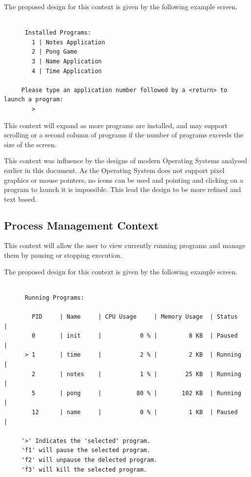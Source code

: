\documentclass[a4paper]{report}
\begin{document}
The proposed design for this context is given by the following example screen.
{\ttfamily \small
  \begin{framed}
    \begin{verbatim}

      Installed Programs:
        1 | Notes Application
        2 | Pong Game
        3 | Name Application
        4 | Time Application

     Please type an application number followed by a <return> to launch a program:
        >

    \end{verbatim}
  \end{framed}
}


This context will expand as more programs are installed, and may support scrolling or a second column of programs if the number of programs exceeds the size of the screen.

This context was influence by the designs of modern Operating Systems analysed earlier in this document. As the Operating System does not support pixel graphics or mouse pointers, no icons can be used and pointing and clicking on a program to launch it is impossible. This lead the design to be more refined and text based.


\subsection{Process Management Context}

This context will allow the user to view currently running programs and manage them by pausing or stopping execution.

The proposed design for this context is given by the following example screen.

{\ttfamily \small
  \begin{framed}
    \begin{verbatim}

      Running Programs:

        PID     | Name     | CPU Usage     | Memory Usage  | Status     |
        0       | init     |           0 % |         8 KB  | Paused     |
      > 1       | time     |           2 % |         2 KB  | Running    |
        2       | notes    |           1 % |        25 KB  | Running    |
        5       | pong     |          80 % |       102 KB  | Running    |
        12      | name     |           0 % |         1 KB  | Paused     |

     '>' Indicates the 'selected' program.
     'f1' will pause the selected program.
     'f2' will unpause the delected program.
     'f3' will kill the selected program.

    \end{verbatim}
  \end{framed}
}
\end{document}
